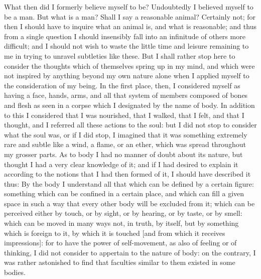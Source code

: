 What then did I formerly believe myself to be? Undoubtedly I believed
myself to be a man. But what is a man? Shall I say a reasonable
animal? Certainly not; for then I should have to inquire what an
animal is, and what is reasonable; and thus from a single question I
should insensibly fall into an infinitude of others more difficult;
and I should not wish to waste the little time and leisure remaining
to me in trying to unravel subtleties like these. But I shall rather
stop here to consider the thoughts which of themselves spring up in my
mind, and which were not inspired by  anything beyond my own
nature alone when I applied myself to the consideration of my being.
In the first place, then, I considered myself as having a face, hands,
arms, and all that system of members composed of bones and flesh as
seen in a corpse which I designated by the name of body. In addition
to this I considered that I was nourished, that I walked, that I felt,
and that I thought, and I referred all these actions to the soul:
but I did not stop to consider what the soul was, or if I did stop, I
imagined that it was something extremely rare and subtle like a wind,
a flame, or an ether, which was spread throughout my grosser parts. As
to body I had no manner of doubt about its nature, but thought I had
a very clear knowledge of it; and if I had desired to explain it
according to the notions that I had then formed of it, I should have
described it thus: By the body I understand all that which can be
defined by a certain figure: something which can be confined in a
certain place, and which can fill a given space in such a way that
every other body will be excluded from it; which can be perceived
either by touch, or by sight, or by hearing, or by taste, or by smell:
which can be moved in many ways not, in truth, by itself, but by
something which is foreign to it, by which it is touched [and from
which it receives impressions]: for to have the power of
self-movement, as also of feeling or of thinking, I did not consider
to appertain to the nature of body: on the contrary, I was rather
astonished to find that faculties similar to them existed in some
bodies.

